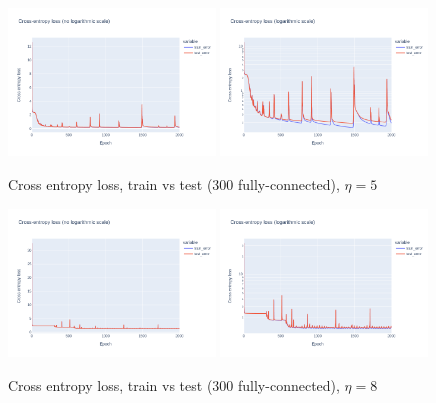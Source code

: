 \documentclass[12pt]{article}
\begin{document}
\begin{figure}[ht]
  \centering
  \includegraphics[width=0.49\textwidth]{images/cross-entropy-comparison-1-300-lr5.png}
  \includegraphics[width=0.49\textwidth]{images/cross-entropy-comparison-1-300-lr5-log.png}
  \caption{Cross entropy loss, train vs test ($300$ fully-connected), $\eta = 5$}
  \label{fig: learning rate comparison 5}
\end{figure}
\begin{figure}[ht]
  \centering
  \includegraphics[width=0.49\textwidth]{images/cross-entropy-comparison-1-300-lr8.png}
  \includegraphics[width=0.49\textwidth]{images/cross-entropy-comparison-1-300-lr8-log.png}
  \caption{Cross entropy loss, train vs test ($300$ fully-connected), $\eta = 8$}
  \label{fig: learning rate comparison 8}
\end{figure}
\end{document}
